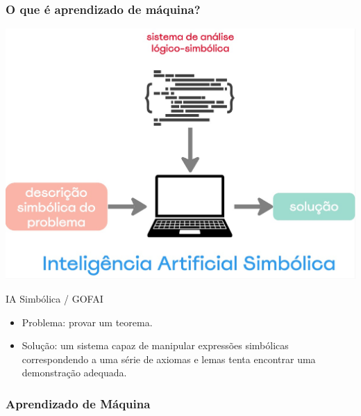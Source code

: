 \begin{frame}
    \frametitle{O que é aprendizado de máquina?}
    \begin{center}
        \includegraphics[height=0.4\paperheight]{./imgs/fig4-ai-simbolica.jpg}
    \end{center}
    \begin{block}{IA Simbólica / GOFAI}
        \begin{itemize}
            \item Problema: provar um teorema. 
            \item Solução: um sistema capaz de manipular expressões simbólicas correspondendo a uma série de axiomas 
            e lemas tenta encontrar uma demonstração adequada.
        \end{itemize}            
    \end{block}
\end{frame}

\subsubsection{Aprendizado de Máquina}

